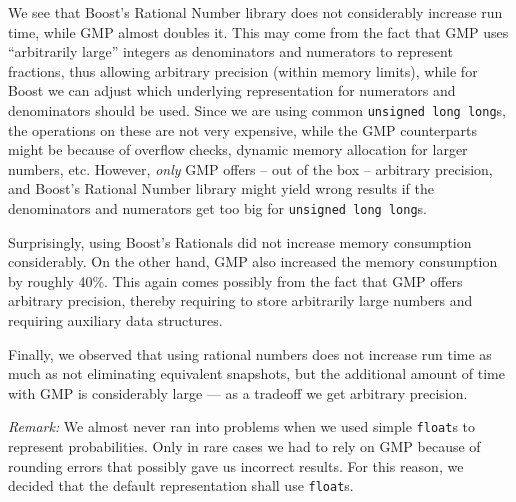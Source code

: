 We see that Boost's Rational Number library does not considerably increase run time, while GMP almost doubles it. This may come from the fact that GMP uses ``arbitrarily large'' integers as denominators and numerators to represent fractions, thus allowing arbitrary precision (within memory limits), while for Boost we can adjust which underlying representation for numerators and denominators should be used. Since we are using common \texttt{unsigned long long}s, the operations on these are not very expensive, while the GMP counterparts might be because of overflow checks, dynamic memory allocation for larger numbers, etc. However, \emph{only} GMP offers -- out of the box -- arbitrary precision, and Boost's Rational Number library might yield wrong results if the denominators and numerators get too big for \texttt{unsigned long long}s.

Surprisingly, using Boost's Rationals did not increase memory consumption considerably. On the other hand, GMP also increased the memory consumption by roughly 40\%. This again comes possibly from the fact that GMP offers arbitrary precision, thereby requiring to store arbitrarily large numbers and requiring auxiliary data structures.

Finally, we observed that using rational numbers does not increase run time as much as not eliminating equivalent snapshots, but the additional amount of time with GMP is considerably large --- as a tradeoff we get arbitrary precision.

\emph{Remark:} We almost never ran into problems when we used simple \texttt{float}s to represent probabilities. Only in rare cases we had to rely on GMP because of rounding errors that possibly gave us incorrect results. For this reason, we decided that the default representation shall use \texttt{float}s.


